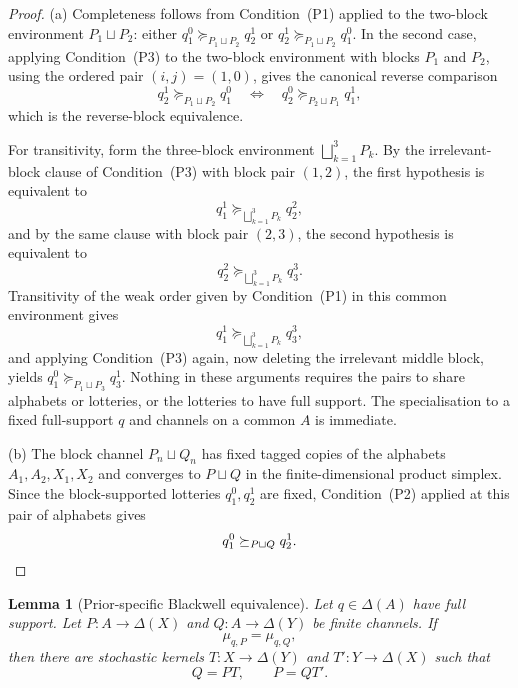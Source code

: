 \documentclass[11pt,a4paper]{article}
\newtheorem{lemma}[theorem]{Lemma}
\theoremstyle{definition}
\newcommand{\1}{\mathbf 1}
\begin{document}
\begin{proof}
\textup{(a)}  Completeness follows from Condition~\textup{(P1)} applied to the two-block environment $P_1\sqcup P_2$: either
$q_1^0\succeq_{P_1\sqcup P_2}q_2^1$ or $q_2^1\succeq_{P_1\sqcup P_2}q_1^0$.  In the second case, applying
Condition~\textup{(P3)} to the two-block environment with blocks $P_1$ and $P_2$, using the ordered pair $(i,j)=(1,0)$,
gives the canonical reverse comparison
\[
q_2^1\succeq_{P_1\sqcup P_2}q_1^0
\quad\Longleftrightarrow\quad
q_2^0\succeq_{P_2\sqcup P_1}q_1^1,
\]
which is the reverse-block equivalence.

For transitivity, form the three-block environment $\bigsqcup_{k=1}^3 P_k$.  By the irrelevant-block clause of
Condition~\textup{(P3)} with block pair $(1,2)$, the first hypothesis is equivalent to
\[
q_1^1\succeq_{\bigsqcup_{k=1}^3 P_k}q_2^2,
\]
and by the same clause with block pair $(2,3)$, the second hypothesis is equivalent to
\[
q_2^2\succeq_{\bigsqcup_{k=1}^3 P_k}q_3^3.
\]
Transitivity of the weak order given by Condition~\textup{(P1)} in this common environment gives
\[
q_1^1\succeq_{\bigsqcup_{k=1}^3 P_k}q_3^3,
\]
and applying Condition~\textup{(P3)} again, now deleting the irrelevant middle block, yields
$q_1^0\succeq_{P_1\sqcup P_3}q_3^1$.  Nothing in these arguments requires the pairs to share alphabets or lotteries, or
the lotteries to have full support.  The specialisation to a fixed full-support $q$ and channels on a common $A$ is
immediate.

\textup{(b)}  The block channel $P_n\sqcup Q_n$ has fixed tagged copies of the alphabets $A_1,A_2,X_1,X_2$ and converges
to $P\sqcup Q$ in the finite-dimensional product simplex.  Since
the block-supported lotteries $q_1^0,q_2^1$ are fixed, Condition~\textup{(P2)} applied at this pair of alphabets gives
\[
q_1^0\succeq_{P\sqcup Q}q_2^1.
\qedhere
\]
\end{proof}

\begin{lemma}[Prior-specific Blackwell equivalence]\label{pt:lem:blackwell}
Let $q\in\Delta(A)$ have full support.  Let $P:A\to\Delta(X)$ and $Q:A\to\Delta(Y)$ be finite channels.  If
\[
\mu_{q,P}=\mu_{q,Q},
\]
then there are stochastic kernels $T:X\to\Delta(Y)$ and $T':Y\to\Delta(X)$ such that
\[
Q=PT,
\qquad
P=QT'.
\]
\end{lemma}
\end{document}
